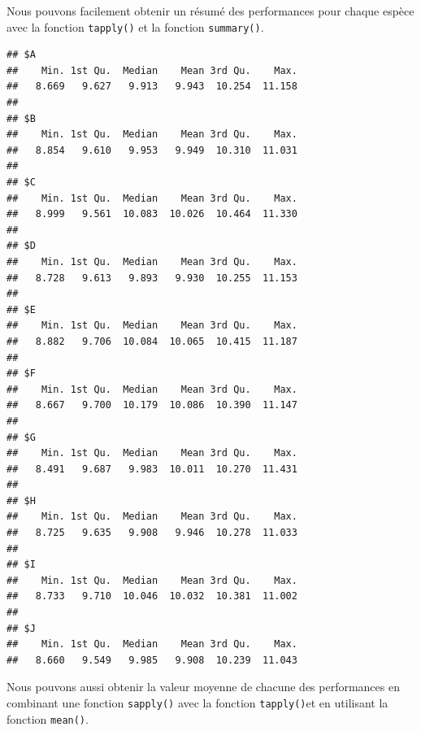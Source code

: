 \documentclass[
]{book}
\newenvironment{Shaded}{\begin{snugshade}}{\end{snugshade}}
\newcommand{\ControlFlowTok}[1]{\textcolor[rgb]{0.13,0.29,0.53}{\textbf{#1}}}
\newcommand{\DataTypeTok}[1]{\textcolor[rgb]{0.13,0.29,0.53}{#1}}
\newcommand{\DecValTok}[1]{\textcolor[rgb]{0.00,0.00,0.81}{#1}}
\newcommand{\KeywordTok}[1]{\textcolor[rgb]{0.13,0.29,0.53}{\textbf{#1}}}
\newcommand{\NormalTok}[1]{#1}
\newcommand{\OperatorTok}[1]{\textcolor[rgb]{0.81,0.36,0.00}{\textbf{#1}}}
\begin{document}
Nous pouvons facilement obtenir un résumé des performances pour chaque espèce avec la fonction \texttt{tapply()} et la fonction \texttt{summary()}.

\begin{Shaded}
\end{Shaded}

\begin{verbatim}
## $A
##    Min. 1st Qu.  Median    Mean 3rd Qu.    Max. 
##   8.669   9.627   9.913   9.943  10.254  11.158 
## 
## $B
##    Min. 1st Qu.  Median    Mean 3rd Qu.    Max. 
##   8.854   9.610   9.953   9.949  10.310  11.031 
## 
## $C
##    Min. 1st Qu.  Median    Mean 3rd Qu.    Max. 
##   8.999   9.561  10.083  10.026  10.464  11.330 
## 
## $D
##    Min. 1st Qu.  Median    Mean 3rd Qu.    Max. 
##   8.728   9.613   9.893   9.930  10.255  11.153 
## 
## $E
##    Min. 1st Qu.  Median    Mean 3rd Qu.    Max. 
##   8.882   9.706  10.084  10.065  10.415  11.187 
## 
## $F
##    Min. 1st Qu.  Median    Mean 3rd Qu.    Max. 
##   8.667   9.700  10.179  10.086  10.390  11.147 
## 
## $G
##    Min. 1st Qu.  Median    Mean 3rd Qu.    Max. 
##   8.491   9.687   9.983  10.011  10.270  11.431 
## 
## $H
##    Min. 1st Qu.  Median    Mean 3rd Qu.    Max. 
##   8.725   9.635   9.908   9.946  10.278  11.033 
## 
## $I
##    Min. 1st Qu.  Median    Mean 3rd Qu.    Max. 
##   8.733   9.710  10.046  10.032  10.381  11.002 
## 
## $J
##    Min. 1st Qu.  Median    Mean 3rd Qu.    Max. 
##   8.660   9.549   9.985   9.908  10.239  11.043
\end{verbatim}

Nous pouvons aussi obtenir la valeur moyenne de chacune des performances en combinant une fonction \texttt{sapply()} avec la fonction \texttt{tapply()}et en utilisant la fonction \texttt{mean()}.

\begin{Shaded}
\end{Shaded}
\end{document}

